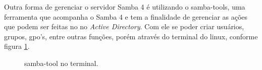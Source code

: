 
Outra forma de gerenciar o servidor Samba 4 é utilizando o samba-tools, uma ferramenta que acompanha o Samba 4 e tem a finalidade de gerenciar as ações que podem ser feitas no no \textit{Active Directory}. Com ele se poder criar usuários, grupos, gpo's, entre outras funções, porém através do terminal do linux, conforme figura \ref{samba-tool}.

\begin{figure}[h!]
   	\centering
   	\caption{samba-tool no terminal.}
    \label{samba-tool}
\end{figure}







